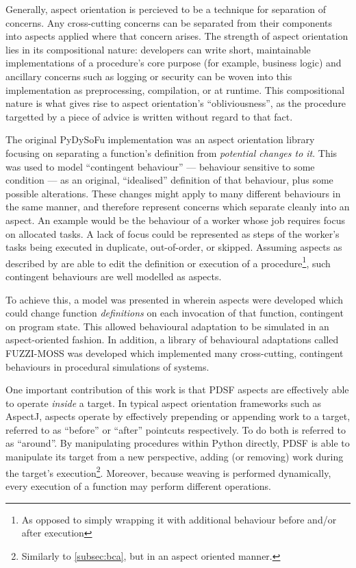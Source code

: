 Generally, aspect orientation is percieved to be a technique for separation of
concerns. Any cross-cutting concerns can be separated from their components into
aspects applied where that concern arises. The strength of aspect orientation
lies in its compositional nature: developers can write short, maintainable
implementations of a procedure's core purpose (for example, business logic) and
ancillary concerns such as logging or security can be woven into this
implementation as preprocessing, compilation, or at runtime. This compositional
nature is what gives rise to aspect orientation's ``obliviousness'', as the
procedure targetted by a piece of advice is written without regard to that fact.

The original PyDySoFu implementation was an aspect orientation library focusing
on separating a function's definition from \emph{potential changes to it}. This
was used to model ``contingent behaviour'' --- behaviour sensitive to some
condition --- as an original, ``idealised'' definition of that behaviour, plus
some possible alterations. These changes might apply to many different
behaviours in the same manner, and therefore represent concerns which separate
cleanly into an aspect. An example would be the behaviour of a worker whose job
requires focus on allocated tasks. A lack of focus could be represented as steps
of the worker's tasks being executed in duplicate, out-of-order, or skipped.
Assuming aspects as described by \citeauthor{kiczales1997aspect} are able to
edit the definition or execution of a procedure\footnote{As opposed to simply
wrapping it with additional behaviour before and/or after execution}, such
contingent behaviours are well modelled as aspects.

To achieve this, a model was presented in \cite{wallis2018caise} wherein aspects
were developed which could change function \emph{definitions} on each invocation
of that function, contingent on program state. This allowed behavioural
adaptation to be simulated in an aspect-oriented fashion. In addition, a library
of behavioural adaptations called FUZZI-MOSS was developed
which implemented many cross-cutting, contingent behaviours in procedural
simulations of \sociotechnical systems.

One important contribution of this work is that PDSF aspects are effectively
able to operate \emph{inside} a target. In typical aspect orientation frameworks
such as AspectJ\cite{aspectj_intro}, aspects operate by effectively prepending
or appending work to a target, referred to as ``before'' or ``after'' pointcuts
respectively. To do both is referred to as ``around''. By manipulating
procedures within Python directly, PDSF is able to manipulate its target from a
new perspective, adding (or removing) work during the target's
execution\footnote{Similarly to \cref{subsec:bca}, but in an aspect oriented
manner.}. Moreover, because weaving is performed dynamically, every execution of
a function may perform different operations.


